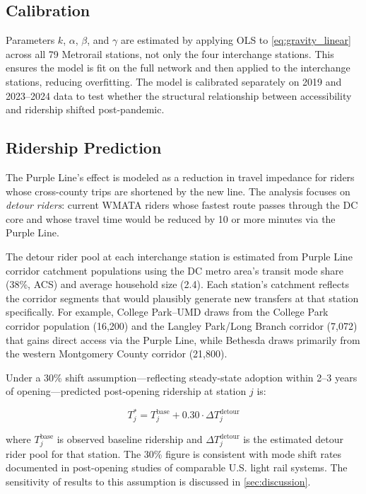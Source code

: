 \documentclass[11pt]{article}
\begin{document}
\subsection{Calibration}

Parameters $k$, $\alpha$, $\beta$, and $\gamma$ are estimated by applying
OLS to \cref{eq:gravity_linear} across all 79 Metrorail stations, not only
the four interchange stations. This ensures the model is fit on the full
network and then applied to the interchange stations, reducing overfitting.
The model is calibrated separately on 2019 and 2023--2024 data to test
whether the structural relationship between accessibility and ridership
shifted post-pandemic.

\subsection{Ridership Prediction}

The Purple Line's effect is modeled as a reduction in travel impedance for
riders whose cross-county trips are shortened by the new line. The analysis
focuses on \textit{detour riders}: current WMATA riders whose fastest route
passes through the DC core and whose travel time would be reduced by 10 or
more minutes via the Purple Line.

The detour rider pool at each interchange station is estimated from Purple
Line corridor catchment populations using the DC metro area's transit mode
share (38\%, ACS) and average household size (2.4). Each station's
catchment reflects the corridor segments that would plausibly generate new
transfers at that station specifically. For example, College Park--UMD
draws from the College Park corridor population (16,200) and the
Langley Park/Long Branch corridor (7,072) that gains direct access via the
Purple Line, while Bethesda draws primarily from the western Montgomery
County corridor (21,800).

Under a 30\% shift assumption---reflecting steady-state adoption within
2--3 years of opening---predicted post-opening ridership at station $j$ is:

\begin{equation}
    T_j^{*} = T_j^{\text{base}} +
    0.30 \cdot \Delta T_j^{\text{detour}}
    \label{eq:prediction}
\end{equation}

\noindent where $T_j^{\text{base}}$ is observed baseline ridership and
$\Delta T_j^{\text{detour}}$ is the estimated detour rider pool for that
station. The 30\% figure is consistent with mode shift rates documented in
post-opening studies of comparable U.S. light rail systems. The sensitivity
of results to this assumption is discussed in \cref{sec:discussion}.
\end{document}
